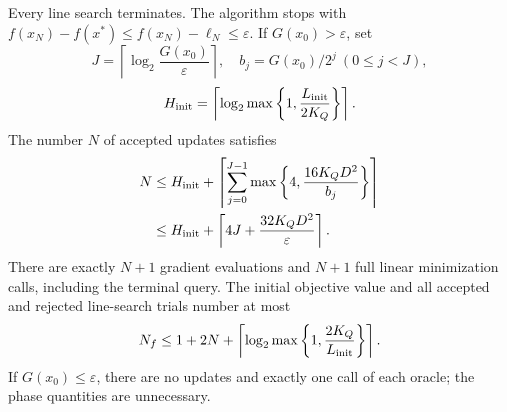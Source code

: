 \begin{theorem}
\label{thm:finite_stopping}
Every line search terminates. The algorithm stops with
$f(x_N)-f(x^*)\le f(x_N)-\ell_N\le\varepsilon$.
If $G(x_0)>\varepsilon$, set
\[
 J=\left\lceil\log_2\frac{G(x_0)}{\varepsilon}\right\rceil,
 \quad b_j=G(x_0)/2^j\ (0\le j<J),
\]
\[
 H_{\rm init}=\left\lceil
 \log_2\max\left\{1,\frac{L_{\rm init}}{2K_Q}\right\}\right\rceil.
\]
The number $N$ of accepted updates satisfies
\begin{align}
 N&\le H_{\rm init}+\left\lceil\sum_{j=0}^{J-1}
       \max\left\{4,\frac{16K_QD^2}{b_j}\right\}\right\rceil
       \label{eq:stopping_steps}\\
  &\le H_{\rm init}+\left\lceil4J+
       \frac{32K_QD^2}{\varepsilon}\right\rceil.
       \label{eq:stopping_simple}
\end{align}
There are exactly $N+1$ gradient evaluations and $N+1$ full linear
minimization calls, including the terminal query. The initial objective
value and all accepted and rejected line-search trials number at most
\begin{equation}\label{eq:stopping_values}
 N_f\le 1+2N+
 \left\lceil\log_2\max\left\{1,\frac{2K_Q}{L_{\rm init}}\right\}\right\rceil.
\end{equation}
If $G(x_0)\le\varepsilon$, there are no updates and exactly one call
of each oracle; the phase quantities are unnecessary.
\end{theorem}

